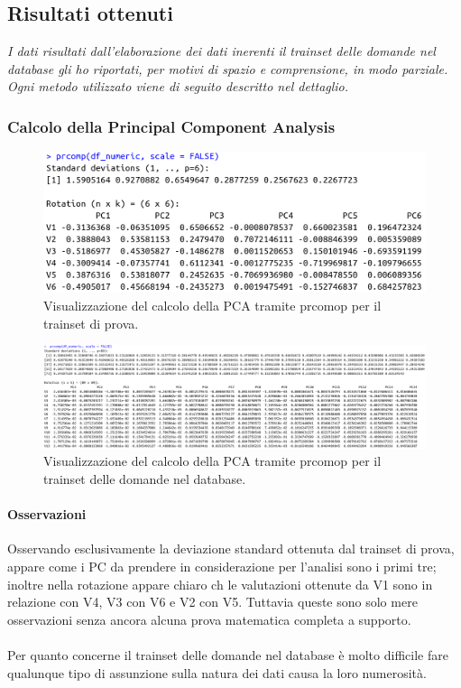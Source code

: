 \subsection{Risultati ottenuti}
\label{Risultati ottenuti}

\textit{I dati risultati dall'elaborazione dei dati inerenti il trainset delle domande nel database gli ho riportati, per motivi di spazio e comprensione, in modo parziale. Ogni metodo utilizzato viene di seguito descritto nel dettaglio.}

\subsubsection{Calcolo della Principal Component Analysis}
\label{Calcolo della Principal Component Analysis}
\begin{figure}[H]
\centering
	\includegraphics[width=0.80\linewidth]{../../PCA/plot/prcomp_rete-prova.png}
	\caption{Visualizzazione del calcolo della PCA tramite prcomop per il trainset di prova.}
	\label{Visualizzazione del calcolo della PCA tramite prcomop per il trainset di prova.}
\end{figure}

\begin{figure}[H]
\centering
	\includegraphics[width=1\linewidth]{../../PCA/plot/prcomp_rete-db.png}
	\caption{Visualizzazione del calcolo della PCA tramite prcomop per il trainset delle domande nel database.}
	\label{Visualizzazione del calcolo della PCA tramite prcomop per il trainset delle domande nel database.}
\end{figure}
\noindent

\paragraph{Osservazioni}
Osservando  esclusivamente la deviazione standard ottenuta dal trainset di prova, appare come i PC da prendere in considerazione per l'analisi sono i primi tre; inoltre  nella rotazione appare chiaro ch le valutazioni ottenute da V1 sono in relazione con V4, V3 con V6 e V2 con V5. Tuttavia queste sono solo mere osservazioni senza ancora alcuna prova matematica  completa a supporto. \\\\ Per quanto concerne il trainset delle domande nel database \`e molto difficile fare qualunque tipo di assunzione sulla natura dei dati causa la loro numerosit\`a.

